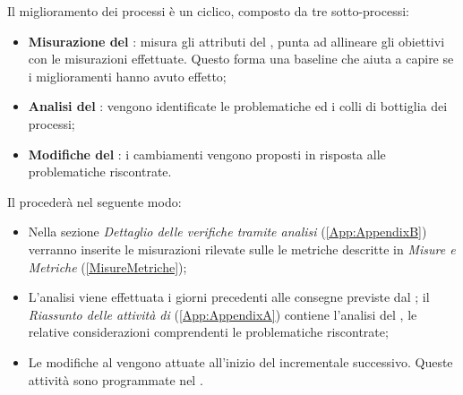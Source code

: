 Il miglioramento dei processi è un  ciclico, composto da tre sotto-processi:
\begin{itemize}
\item \textbf{Misurazione del }: misura gli attributi del , punta ad allineare gli obiettivi con le misurazioni effettuate. Questo forma una baseline che aiuta a capire se i miglioramenti hanno avuto effetto;
\item \textbf{Analisi del }: vengono identificate le problematiche ed i colli di bottiglia dei processi;
\item \textbf{Modifiche del }: i cambiamenti vengono proposti in risposta alle problematiche riscontrate.
\end{itemize}
Il  procederà nel seguente modo: 
\begin{itemize}
\item Nella sezione \textit{Dettaglio delle verifiche tramite analisi} (\ref{App:AppendixB})  verranno inserite le misurazioni rilevate sulle le metriche descritte in \textit{Misure e Metriche} (\ref{MisureMetriche});
\item L'analisi viene effettuata i giorni precedenti alle consegne previste dal ; il \textit{Riassunto delle attività di } (\ref{App:AppendixA}) contiene l'analisi del , le relative considerazioni  comprendenti le problematiche riscontrate;
\item Le modifiche al  vengono attuate all'inizio del  incrementale successivo. Queste attività sono programmate nel \PianoDiProgetto.
\end{itemize}
